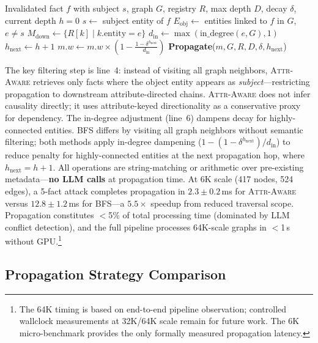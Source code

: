 \documentclass{article}
\newcommand{\attraware}{\textsc{Attr-Aware}}
\newcommand{\bfsprop}{\textsc{BFS}}
\begin{document}
\begin{algorithm}[htbp]
\caption{\attraware{} Selective Propagation}
\label{alg:attraware}
\begin{algorithmic}[1]
\REQUIRE Invalidated fact $f$ with subject $s$, graph $G$, registry $R$, max depth $D$, decay $\delta$, current depth $h{=}0$
\STATE $s \leftarrow$ subject entity of $f$
\STATE $E_{\text{obj}} \leftarrow$ entities linked to $f$ in $G$, $e \neq s$
  \STATE $M_{\text{down}} \leftarrow \{R[k] \mid k.\text{entity} = e\}$ 
    \STATE $d_{\text{in}} \leftarrow \max(\text{in\_degree}(e, G), 1)$
    \STATE $h_{\text{next}} \leftarrow h + 1$
    \STATE $m.w \leftarrow m.w \times (1 - \frac{1-\delta^{h_{\text{next}}}}{d_{\text{in}}})$
      \STATE \textbf{Propagate}($m, G, R, D, \delta, h_{\text{next}}$)
    \ENDIF
  \ENDFOR
\ENDFOR
\end{algorithmic}
\end{algorithm}

The key filtering step is line~4: instead of visiting all graph neighbors, \attraware{} retrieves only facts where the object entity appears as \textit{subject}---restricting propagation to downstream attribute-directed chains.
\attraware{} does not infer causality directly; it uses attribute-keyed directionality as a conservative proxy for dependency.
The in-degree adjustment (line~6) dampens decay for highly-connected entities.
\bfsprop{} differs by visiting all graph neighbors without semantic filtering; both methods apply in-degree dampening ($1 - (1-\delta^{h_{\text{next}}})/d_{\text{in}}$) to reduce penalty for highly-connected entities at the next propagation hop, where $h_{\text{next}}=h+1$.
All operations are string-matching or arithmetic over pre-existing metadata---\textbf{no LLM calls} at propagation time.
At 6K scale (417 nodes, 524 edges), a 5-fact attack completes propagation in $2.3\pm0.2$\,ms for \attraware{} versus $12.8\pm1.2$\,ms for BFS---a $5.5\times$ speedup from reduced traversal scope.
Propagation constitutes $<$5\% of total processing time (dominated by LLM conflict detection), and the full pipeline processes 64K-scale graphs in $<$1\,s without GPU.\footnote{The 64K timing is based on end-to-end pipeline observation; controlled wallclock measurements at 32K/64K scale remain for future work.  The 6K micro-benchmark provides the only formally measured propagation latency.}

\subsection{Propagation Strategy Comparison}
\end{document}
